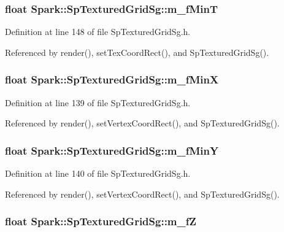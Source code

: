 \subsubsection{\setlength{\rightskip}{0pt plus 5cm}float {\bf Spark::Sp\-Textured\-Grid\-Sg::m\_\-f\-Min\-T}\hspace{0.3cm}{\tt  [protected]}}\label{classSpark_1_1SpTexturedGridSg_p9}


Definition at line 148 of file Sp\-Textured\-Grid\-Sg.h.

Referenced by render(), set\-Tex\-Coord\-Rect(), and Sp\-Textured\-Grid\-Sg().
\subsubsection{\setlength{\rightskip}{0pt plus 5cm}float {\bf Spark::Sp\-Textured\-Grid\-Sg::m\_\-f\-Min\-X}\hspace{0.3cm}{\tt  [protected]}}\label{classSpark_1_1SpTexturedGridSg_p2}


Definition at line 139 of file Sp\-Textured\-Grid\-Sg.h.

Referenced by render(), set\-Vertex\-Coord\-Rect(), and Sp\-Textured\-Grid\-Sg().
\subsubsection{\setlength{\rightskip}{0pt plus 5cm}float {\bf Spark::Sp\-Textured\-Grid\-Sg::m\_\-f\-Min\-Y}\hspace{0.3cm}{\tt  [protected]}}\label{classSpark_1_1SpTexturedGridSg_p3}


Definition at line 140 of file Sp\-Textured\-Grid\-Sg.h.

Referenced by render(), set\-Vertex\-Coord\-Rect(), and Sp\-Textured\-Grid\-Sg().
\subsubsection{\setlength{\rightskip}{0pt plus 5cm}float {\bf Spark::Sp\-Textured\-Grid\-Sg::m\_\-f\-Z}\hspace{0.3cm}{\tt  [protected]}}\label{classSpark_1_1SpTexturedGridSg_p6}


